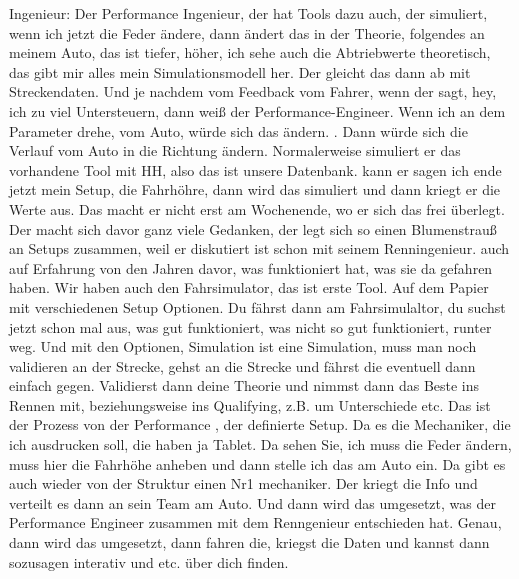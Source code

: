 Ingenieur: 
Der Performance Ingenieur, der hat Tools dazu auch,  der simuliert, wenn ich jetzt die Feder ändere, dann ändert das in der Theorie, folgendes an meinem Auto, das ist tiefer, höher, ich sehe auch die Abtriebwerte theoretisch, das gibt mir alles mein Simulationsmodell her. Der gleicht das dann ab mit Streckendaten.  Und je nachdem vom Feedback vom Fahrer, wenn der sagt, hey, ich zu viel Untersteuern, dann weiß der Performance-Engineer. Wenn ich an dem Parameter drehe, vom Auto, würde sich das ändern. . Dann würde sich die Verlauf vom Auto in die Richtung ändern. Normalerweise simuliert er das vorhandene Tool mit HH, also das ist unsere Datenbank.  kann er sagen ich ende jetzt mein Setup, die Fahrhöhre, dann wird das simuliert und dann kriegt er die Werte aus. Das macht er nicht erst am Wochenende, wo er sich das frei überlegt. Der macht sich davor ganz viele Gedanken, der legt sich so einen Blumenstrauß an Setups zusammen, weil er diskutiert ist schon mit seinem Renningenieur. auch auf Erfahrung von den Jahren davor, was funktioniert hat, was sie da gefahren haben. Wir haben auch den Fahrsimulator, das ist erste Tool. Auf dem Papier mit verschiedenen Setup Optionen. Du fährst dann am Fahrsimulaltor, du suchst jetzt schon mal aus, was gut funktioniert, was nicht so gut funktioniert, runter weg. Und mit den Optionen, Simulation ist eine Simulation, muss man noch validieren an der Strecke, gehst an die Strecke und fährst die eventuell dann einfach gegen. Validierst dann deine Theorie und nimmst dann das Beste ins Rennen mit, beziehungsweise ins Qualifying, z.B. um Unterschiede etc.  Das ist der Prozess von der Performance , der definierte Setup. Da es die Mechaniker, die ich ausdrucken soll, die haben ja Tablet. Da sehen Sie, ich muss die Feder ändern, muss hier die Fahrhöhe anheben  und dann stelle ich das am Auto ein. Da gibt es auch wieder von der Struktur einen Nr1 mechaniker.  Der kriegt  die Info und verteilt es dann an sein Team am Auto. Und dann wird das umgesetzt, was  der Performance Engineer zusammen mit dem Renngenieur entschieden hat. Genau, dann wird das umgesetzt, dann fahren die, kriegst die Daten und kannst dann sozusagen interativ und etc. über dich finden. 


